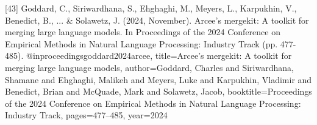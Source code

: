 \documentclass{article}
\begin{document}
{[43] Goddard, C., Siriwardhana, S., Ehghaghi, M., Meyers, L., Karpukhin, V., Benedict, B., ... & Solawetz, J. (2024, November). Arcee’s mergekit: A toolkit for merging large language models. In Proceedings of the 2024 Conference on Empirical Methods in Natural Language Processing: Industry Track (pp. 477-485).
@inproceedings{goddard2024arcee,
  title={Arcee’s mergekit: A toolkit for merging large language models},
  author={Goddard, Charles and Siriwardhana, Shamane and Ehghaghi, Malikeh and Meyers, Luke and Karpukhin, Vladimir and Benedict, Brian and McQuade, Mark and Solawetz, Jacob},
  booktitle={Proceedings of the 2024 Conference on Empirical Methods in Natural Language Processing: Industry Track},
  pages={477--485},
  year={2024}
}




}
\end{document}
